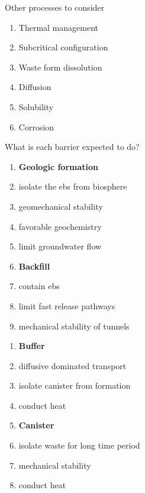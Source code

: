 \documentclass[aspectratio=1610,pdftex,dvipsnames,compress,xcolor={dvipsnames}]{beamer}
\newcommand{\acs}{\acrshort} %
\begin{document}
\begin{frame}{Other processes to consider}
    \begin{enumerate}[series=outerlist,topsep=0pt,itemsep=21pt,leftmargin=*,label=(\arabic*)]
        \item[]Thermal management
        \item[]Subcritical configuration
        \item[]Waste form dissolution
        \item[]Diffusion
        \item[]Solubility
        \item[]Corrosion
    \end{enumerate}
\end{frame}


\begin{frame}{What is each barrier expected to do?}
    \begin{enumerate}[series=outerlist,topsep=0pt,itemsep=1pt,leftmargin=*,label=(\arabic*)]
        \item[]\textbf{Geologic formation}
        \item[]isolate the \acs{ebs} from biosphere
        \item[]geomechanical stability
        \item[]favorable geochemistry
        \item[]limit groundwater flow
            \vspace{0.10in}
        \item[]\textbf{Backfill}
        \item[]contain \acs{ebs}
        \item[]limit fast release pathways
        \item[]mechanical stability of tunnels
    \end{enumerate}
\end{frame}


\begin{frame}[t]{}
    \begin{enumerate}[series=outerlist,topsep=0pt,itemsep=1pt,leftmargin=*,label=(\arabic*)]
        \item[]\textbf{Buffer}
        \item[]diffusive dominated transport 
        \item[]isolate canister from formation
        \item[]conduct heat
            \vspace{0.10in}
        \item[]\textbf{Canister}
        \item[]isolate waste for long time period
        \item[]mechanical stability
        \item[]conduct heat
    \end{enumerate}
\end{frame}
\end{document}
